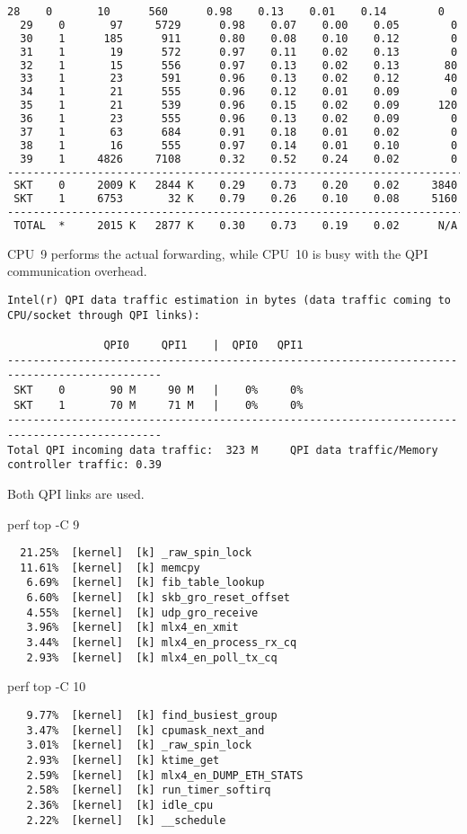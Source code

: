 \begin{lstlisting}[language=TeX]
  28    0       10      560      0.98    0.13    0.01    0.14        0
  29    0       97     5729      0.98    0.07    0.00    0.05        0
  30    1      185      911      0.80    0.08    0.10    0.12        0
  31    1       19      572      0.97    0.11    0.02    0.13        0
  32    1       15      556      0.97    0.13    0.02    0.13       80
  33    1       23      591      0.96    0.13    0.02    0.12       40
  34    1       21      555      0.96    0.12    0.01    0.09        0
  35    1       21      539      0.96    0.15    0.02    0.09      120
  36    1       23      555      0.96    0.13    0.02    0.09        0
  37    1       63      684      0.91    0.18    0.01    0.02        0
  38    1       16      555      0.97    0.14    0.01    0.10        0
  39    1     4826     7108      0.32    0.52    0.24    0.02        0
------------------------------------------------------------------------
 SKT    0     2009 K   2844 K    0.29    0.73    0.20    0.02     3840
 SKT    1     6753       32 K    0.79    0.26    0.10    0.08     5160
------------------------------------------------------------------------
 TOTAL  *     2015 K   2877 K    0.30    0.73    0.19    0.02      N/A
\end{lstlisting}

CPU~9 performs the actual forwarding, while CPU~10
is busy with the QPI communication overhead.

\begin{lstlisting}
Intel(r) QPI data traffic estimation in bytes (data traffic coming to CPU/socket through QPI links):

               QPI0     QPI1    |  QPI0   QPI1  
----------------------------------------------------------------------------------------------
 SKT    0       90 M     90 M   |    0%     0%   
 SKT    1       70 M     71 M   |    0%     0%   
----------------------------------------------------------------------------------------------
Total QPI incoming data traffic:  323 M     QPI data traffic/Memory controller traffic: 0.39
\end{lstlisting}
Both QPI links are used.


perf top -C 9
\begin{lstlisting}
  21.25%  [kernel]  [k] _raw_spin_lock
  11.61%  [kernel]  [k] memcpy
   6.69%  [kernel]  [k] fib_table_lookup
   6.60%  [kernel]  [k] skb_gro_reset_offset
   4.55%  [kernel]  [k] udp_gro_receive
   3.96%  [kernel]  [k] mlx4_en_xmit
   3.44%  [kernel]  [k] mlx4_en_process_rx_cq
   2.93%  [kernel]  [k] mlx4_en_poll_tx_cq
\end{lstlisting}

perf top -C 10
\begin{lstlisting}
   9.77%  [kernel]  [k] find_busiest_group
   3.47%  [kernel]  [k] cpumask_next_and
   3.01%  [kernel]  [k] _raw_spin_lock
   2.93%  [kernel]  [k] ktime_get
   2.59%  [kernel]  [k] mlx4_en_DUMP_ETH_STATS
   2.58%  [kernel]  [k] run_timer_softirq
   2.36%  [kernel]  [k] idle_cpu
   2.22%  [kernel]  [k] __schedule
\end{lstlisting}
